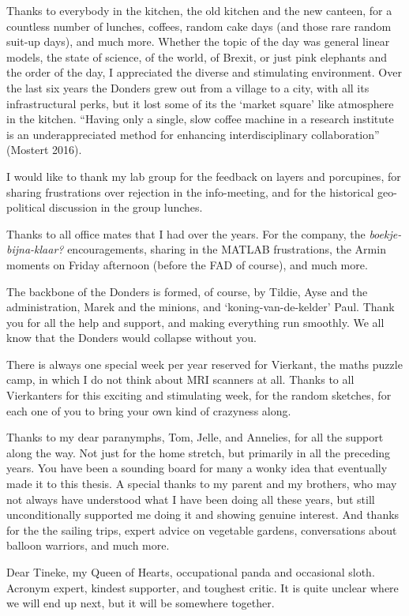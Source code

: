 Thanks to everybody in the kitchen, the old kitchen and the new canteen, for a countless number of lunches, coffees, random cake days (and those rare random suit-up days), and much more. Whether the topic of the day was general linear models, the state of science, of the world, of Brexit, or just pink elephants and the order of the day, I appreciated the diverse and stimulating environment. Over the last six years the Donders grew out from a village to a city, with all its infrastructural perks, but it lost some of its the `market square' like atmosphere in the kitchen. ``Having only a single, slow coffee machine in a research institute is an underappreciated method for enhancing interdisciplinary collaboration'' (Mostert 2016).

I would like to thank my lab group for the feedback on layers and porcupines, for sharing frustrations over rejection in the info-meeting, and for the historical geo-political discussion in the group lunches.

Thanks to all office mates that I had over the years. For the company, the \emph{boekje-bijna-klaar?} encouragements, sharing in the MATLAB frustrations, the Armin moments on Friday afternoon (before the FAD of course), and much more. 
 
The backbone of the Donders is formed, of course, by Tildie, Ayse and the administration, Marek and the minions, and `koning-van-de-kelder' Paul. Thank you for all the help and support, and making everything run smoothly. We all know that the Donders would collapse without you. 

There is always one special week per year reserved for Vierkant, the maths puzzle camp, in which I do not think about MRI scanners at all. Thanks to all Vierkanters for this exciting and stimulating week, for the random sketches, for each one of you to bring your own kind of crazyness along. 

Thanks to my dear paranymphs, Tom, Jelle, and Annelies, for all the support along the way. Not just for the home stretch, but primarily in all the preceding years. You have been a sounding board for many a wonky idea that eventually made it to this thesis. A special thanks to my parent and my brothers, who may not always have understood what I have been doing all these years, but still unconditionally supported me doing it and showing genuine interest. And thanks for the the sailing trips, expert advice on vegetable gardens, conversations about balloon warriors, and much more. 

Dear Tineke, my Queen of Hearts, occupational panda and occasional sloth. Acronym expert, kindest supporter, and toughest critic. It is quite unclear where we will end up next, but it will be somewhere together. 





